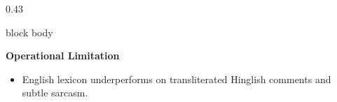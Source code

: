 \documentclass[aspectratio=169, 10pt]{beamer}
\newenvironment{card}[1][]{%
        \begin{beamercolorbox}[rounded=true,shadow=false,wd=\linewidth,sep=3.5pt,#1]{block body}%
        \fontsize{7.8pt}{9.8pt}\selectfont%
    }{%
        \end{beamercolorbox}%
    }
\begin{document}
\begin{frame}[t]
\begin{columns}[T]
            \begin{column}{0.43\textwidth}                                                                                                                                                             
                \begin{card}                                                                                                                                                                           
                    {\fontsize{7.5pt}{9pt}\selectfont \textbf{\color{CoralAccent}Operational Limitation}}\\[0.04cm]                                                                                    
                    \begin{itemize}\setlength{\itemsep}{1.5pt}                                                                                                                                         
                        \item English lexicon underperforms on transliterated Hinglish comments and subtle sarcasm.                                                                                    
                    \end{itemize}                                                                                                                                                                      
                \end{card}                                                                                                                                                                             
            \end{column}                                                                                                                                                                               
        \end{columns}                                                                                                                                                                                  
    \end{frame}                                                                                                                                                                                        
                                                                                                                                                                                                       
\end{document}
